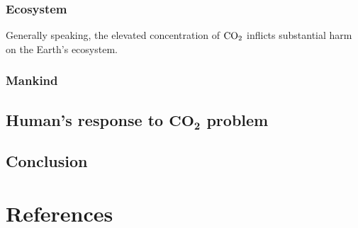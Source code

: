 \documentclass[12pt,a4paper]{article}
\begin{document}
    \subsubsection{Ecosystem}
    Generally speaking, the elevated concentration of $\ce{CO2}$ inflicts substantial harm on the Earth's ecosystem.  
    \subsubsection{Mankind}
    \subsection{Human's response to $\mathbf{CO_2}$ problem}
    \subsection{Conclusion}

    \newpage
    \section{References}
    \printbibliography[heading=none]
    
\end{document}
